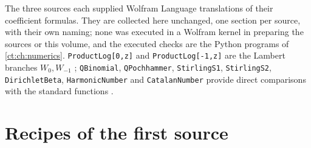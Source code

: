 \documentclass[11pt,openany]{book}
\numberwithin{equation}{chapter}
\theoremstyle{plain}
\theoremstyle{definition}
\theoremstyle{remark}
\begin{document}
The three sources each supplied Wolfram Language translations of their
coefficient formulas.  They are collected here unchanged, one section per
source, with their own naming; none was executed in a Wolfram kernel in
preparing the sources or this volume, and the executed checks are the
Python programs of \cref{ct:ch:numerics}.  \texttt{ProductLog[0,z]} and
\texttt{ProductLog[-1,z]} are the Lambert branches $W_0,W_{-1}$
\cite{wlproductlog}; \texttt{QBinomial}, \texttt{QPochhammer},
\texttt{StirlingS1}, \texttt{StirlingS2}, \texttt{DirichletBeta},
\texttt{HarmonicNumber} and \texttt{CatalanNumber} provide direct
comparisons with the standard functions
\cite{wlqbinomial,wlqpochhammer,wlstirling1,wlstirling2,wlbeta,wlharmonic,wlcatalan}.

\section{Recipes of the first source}
\label{ct:app:wolfram-t1}
\end{document}
